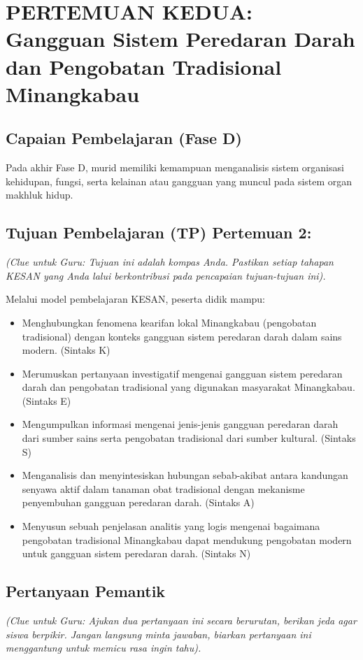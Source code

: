 \documentclass[a4paper,12pt]{article}
\begin{document}
\section{PERTEMUAN KEDUA: Gangguan Sistem Peredaran Darah dan Pengobatan Tradisional Minangkabau}

\subsection{Capaian Pembelajaran (Fase D)}
Pada akhir Fase D, murid memiliki kemampuan menganalisis sistem organisasi kehidupan, fungsi, serta kelainan atau gangguan yang muncul pada sistem organ makhluk hidup.

\subsection{Tujuan Pembelajaran (TP) Pertemuan 2:}
\textit{(Clue untuk Guru: Tujuan ini adalah kompas Anda. Pastikan setiap tahapan KESAN yang Anda lalui berkontribusi pada pencapaian tujuan-tujuan ini).}

Melalui model pembelajaran KESAN, peserta didik mampu:
\begin{itemize}
\item Menghubungkan fenomena kearifan lokal Minangkabau (pengobatan tradisional) dengan konteks gangguan sistem peredaran darah dalam sains modern. (Sintaks K)
\item Merumuskan pertanyaan investigatif mengenai gangguan sistem peredaran darah dan pengobatan tradisional yang digunakan masyarakat Minangkabau. (Sintaks E)
\item Mengumpulkan informasi mengenai jenis-jenis gangguan peredaran darah dari sumber sains serta pengobatan tradisional dari sumber kultural. (Sintaks S)
\item Menganalisis dan menyintesiskan hubungan sebab-akibat antara kandungan senyawa aktif dalam tanaman obat tradisional dengan mekanisme penyembuhan gangguan peredaran darah. (Sintaks A)
\item Menyusun sebuah penjelasan analitis yang logis mengenai bagaimana pengobatan tradisional Minangkabau dapat mendukung pengobatan modern untuk gangguan sistem peredaran darah. (Sintaks N)
\end{itemize}

\subsection{Pertanyaan Pemantik}
\textit{(Clue untuk Guru: Ajukan dua pertanyaan ini secara berurutan, berikan jeda agar siswa berpikir. Jangan langsung minta jawaban, biarkan pertanyaan ini menggantung untuk memicu rasa ingin tahu).}
\end{document}
